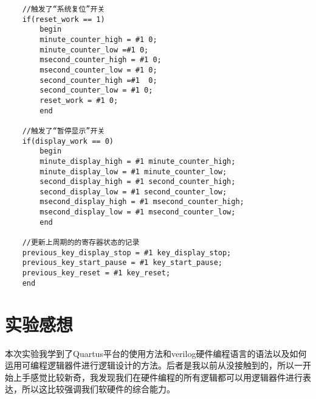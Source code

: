 \documentclass[UTF8]{ctexart}
\begin{document}
\begin{verbatim}
    //触发了“系统复位”开关
    if(reset_work == 1)
        begin
        minute_counter_high = #1 0;
        minute_counter_low =#1 0;
        msecond_counter_high = #1 0;
        msecond_counter_low = #1 0;
        second_counter_high =#1  0;
        second_counter_low = #1 0;
        reset_work = #1 0;
        end

    //触发了“暂停显示”开关
    if(display_work == 0)
        begin
        minute_display_high = #1 minute_counter_high;
        minute_display_low = #1 minute_counter_low;
        second_display_high = #1 second_counter_high;
        second_display_low = #1 second_counter_low;
        msecond_display_high = #1 msecond_counter_high;
        msecond_display_low = #1 msecond_counter_low;
        end

    //更新上周期的的寄存器状态的记录
    previous_key_display_stop = #1 key_display_stop;
    previous_key_start_pause = #1 key_start_pause;
    previous_key_reset = #1 key_reset;
    end
\end{verbatim}

\section{实验感想}
本次实验我学到了Quartus平台的使用方法和verilog硬件编程语言的语法以及如何运用可编程逻辑器件进行逻辑设计的方法。后者是我以前从没接触到的，所以一开始上手感觉比较新奇，我发现我们在硬件编程的所有逻辑都可以用逻辑器件进行表达，所以这比较强调我们软硬件的综合能力。
\end{document}
